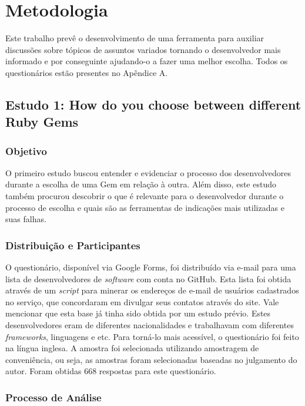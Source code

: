 \chapter{Metodologia}

Este trabalho prevê o desenvolvimento de uma ferramenta para auxiliar discussões sobre tópicos de assuntos variados tornando o desenvolvedor mais informado e por conseguinte ajudando-o a fazer uma melhor escolha. Todos os questionários estão presentes no Apêndice A.

\section{Estudo 1: How do you choose between different Ruby Gems}

\subsection{Objetivo}

O primeiro estudo buscou entender e evidenciar o processo dos desenvolvedores durante a escolha de uma Gem em relação à outra. Além disso, este estudo também procurou descobrir o que é relevante para o desenvolvedor durante o processo de escolha e quais são as ferramentas de indicações mais utilizadas e suas falhas.

\subsection{Distribuição e Participantes}

O questionário, disponível via Google Forms, foi distribuído via e-mail para uma lista de desenvolvedores de \textit{software} com conta no GitHub. Esta lista foi obtida através de um \textit{script} para minerar os endereços de e-mail de usuários cadastrados no serviço, que concordaram em divulgar seus contatos através do site. Vale mencionar que esta base já tinha sido obtida por um estudo prévio. Estes desenvolvedores eram de diferentes nacionalidades e trabalhavam com diferentes \textit{frameworks}, linguagens e etc. Para torná-lo mais acessível, o questionário foi feito na língua inglesa. A amostra foi selecionada utilizando amostragem de conveniência, ou seja, as amostras foram selecionadas baseadas no julgamento do autor. Foram obtidas 668 respostas para este questionário.

\subsection{Processo de Análise}

